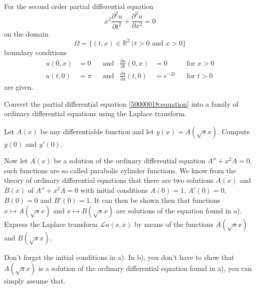 For the second order partial differential equation 
\begin{equation}
x^2 \frac{\partial^2 u}{\partial t^2}
+
\frac{\partial^2 u}{\partial x^2}
=
0
\label{50000018:equation}
\end{equation}
on the domain 
\[
\Omega
= 
\{ (t,x)\in\mathbb R^2\,|\, t>0 \text{ and } x > 0\}
\]
boundary conditions
\[
\begin{aligned}
u(0,x) &= 0 & &\text{and}& \frac{\partial u}{\partial t}(0,x) &= 0 & &\text{for $x>0$}\\
u(t,0) &= \pi &&\text{and}&\frac{\partial u}{\partial x}(t,0)&=e^{-2t} &&\text{for $t>0$}
\end{aligned}
\]
are given.
\begin{teilaufgaben}
\item
Convert the partial differential equation \eqref{50000018:equation} into
a family of ordinary differential equations using the Laplace transform.
\item
Let $A(x)$ be any differentiable function and let $y(x)=A(\!\sqrt{s}x)$.
Compute $y(0)$ and $y'(0)$.
\item
Now let $A(x)$ be a solution of the ordinary differential equation
$A''+x^2A=0$, such functions are so called parabolic cylinder functions.
We know from the theory of ordinary differential equations that there are
two solutions $A(x)$ and $B(x)$ of $A''+x^2A=0$ with initial conditions
$A(0)=1$, $A'(0)=0$, $B(0)=0$ and $B'(0)=1$.
It can then be shown then that functions $x\mapsto A(\!\sqrt{s}x)$
and $x\mapsto B(\!\sqrt{s}x)$  are solutions of the equation found in a).
Express the Laplace transform $\mathcal{L}u(s,x)$ by means of the functions
$A(\!\sqrt{s}x)$ and $B(\!\sqrt{s}x)$.
\end{teilaufgaben}

\begin{hinweis}
Don't forget the initial conditions in a).
In b), you don't have to show that $A(\!\sqrt{s}x)$ is a solution of the
ordinary differential equation found in a), you can simply assume that.
\end{hinweis}

